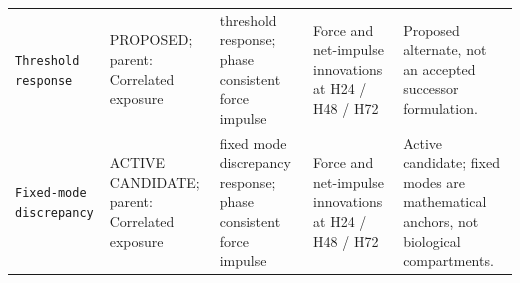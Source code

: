 \begin{longtable}{>{\raggedright\arraybackslash}p{0.95in}>{\raggedright\arraybackslash}p{1.10in}>{\raggedright\arraybackslash}p{1.50in}>{\raggedright\arraybackslash}p{1.10in}>{\raggedright\arraybackslash}p{1.15in}}
\texttt{Threshold response} & PROPOSED; parent: Correlated exposure & threshold response; phase consistent force impulse & Force and net-impulse innovations at H24 / H48 / H72 & Proposed alternate, not an accepted successor formulation. \\
\texttt{Fixed-mode discrepancy} & ACTIVE CANDIDATE; parent: Correlated exposure & fixed mode discrepancy response; phase consistent force impulse & Force and net-impulse innovations at H24 / H48 / H72 & Active candidate; fixed modes are mathematical anchors, not biological compartments. \\
\end{longtable}
